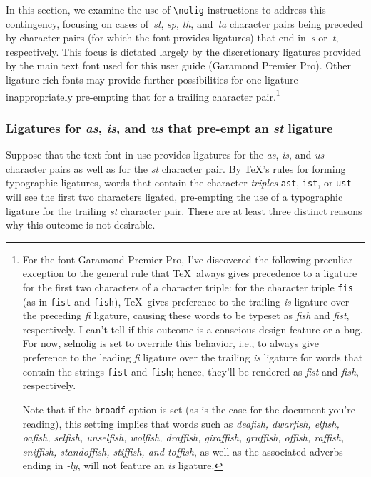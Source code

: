 \documentclass[11pt]{article}
\newcommand{\pkg}[1]{\textsf{#1}}
\newcommand{\opt}[1]{\texttt{#1}}
\newcommand{\cmmd}[1]{\texttt{\textbackslash #1}}
\begin{document}
In this section, we examine the use of \cmmd{nolig} instructions to address this contingency, focusing on cases of~\emph{st}, \emph{sp}, \emph{th}, and~\emph{ta} character pairs being preceded by character pairs (for which the font provides ligatures) that end in~\emph{s} or~\emph{t}, respectively. This focus is dictated largely by the discretionary ligatures provided by the main text font used for this user guide (Garamond Premier Pro). Other ligature-rich fonts may provide further possibilities for one ligature inappropriately pre-empting that for a trailing character pair.\footnote{For the font Garamond Premier Pro, I've discovered the following preculiar exception to the general rule that \TeX\ always gives precedence to a ligature for the first two characters of a character triple: for the character triple \opt{fis} (as in \opt{fist} and \opt{fish}), \TeX\ gives preference to the trailing \emph{is} ligature over the preceding \emph{fi} ligature, causing these words to be typeset as \emph{f\mbox{is}h} and \emph{f\mbox{is}t}, respectively. I can't tell if this outcome is a conscious design feature or a bug. For now, \pkg{selnolig} is set to override this behavior, i.e., to always give preference to the leading \emph{fi} ligature over the trailing \emph{is} ligature for words that contain the strings \opt{fist} and \opt{fish}; hence, they'll be rendered as \emph{fist} and \emph{fish}, respectively. 

Note that if the \opt{broadf} option is set (as is the case for the document you're reading), this setting implies that words such as \emph{deafish, dwarfish, elfish, oafish, selfish, unselfish, wolfish, draffish, giraffish, gruffish, offish, raffish, sniffish, standoffish, stiffish, \emph{and} toffish}, as well as the associated adverbs ending in \emph{-ly}, will not feature an \emph{is} ligature.}



\subsubsection*{Ligatures for \emph{as}, \emph{is}, and \emph{us} that pre-empt an \emph{st} ligature}

Suppose that the text font in use provides ligatures for the \emph{as}, \emph{is}, and \emph{us} character pairs as well as for the \emph{st} character pair. By \TeX's rules for forming typographic ligatures, words that contain the character \emph{triples} \opt{ast}, \opt{ist}, or \opt{ust} will see the first two characters ligated, pre-empting the use of a typographic ligature for the trailing \emph{st} character pair. There are at least three distinct reasons why this outcome is not desirable.
\end{document}
